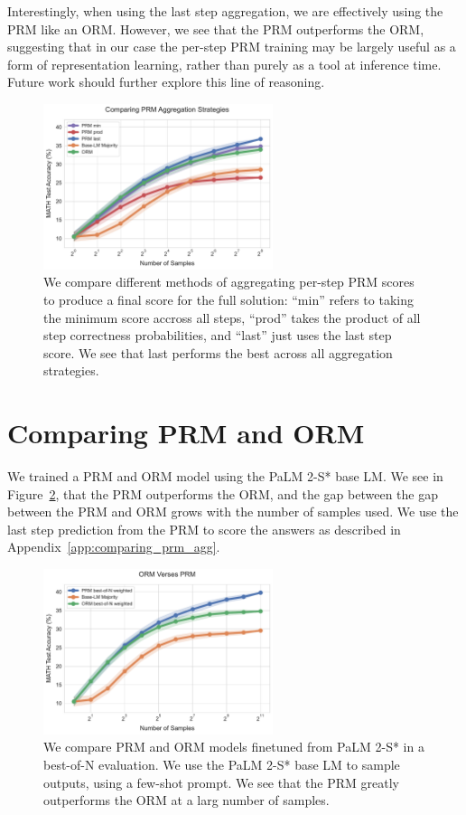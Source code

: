 \documentclass[11pt, letterpaper, logo]{googledeepmind}
\begin{document}
Interestingly, when using the last step aggregation, we are effectively using the PRM like an ORM. However, we see that the PRM outperforms the ORM, suggesting that in our case the per-step PRM training may be largely useful as a form of representation learning, rather than purely as a tool at inference time. Future work should further explore this line of reasoning.

\begin{figure}
    \centering
    \includegraphics[width=0.6\textwidth]{figures/prm_agg_comparing_output.pdf}
    \caption{We compare different methods of aggregating per-step PRM scores to produce a final score for the full solution: ``min'' refers to taking the minimum score accross all steps, ``prod'' takes the product of all step correctness probabilities, and ``last'' just uses the last step score. We see that last performs the best across all aggregation strategies.}
    \label{fig:comparing_prm_aggregations}
\end{figure}

\section{Comparing PRM and ORM}
\label{app:comparing_prm_orm}

We trained a PRM and ORM model using the PaLM 2-S* base LM. We see in Figure~\ref{fig:prm_v_orm}, that the PRM outperforms the ORM, and the gap between the gap between the PRM and ORM grows with the number of samples used. We use the last step prediction from the PRM to score the answers as described in Appendix~\ref{app:comparing_prm_agg}.

\begin{figure}
    \centering
    \includegraphics[width=0.6\textwidth]{figures/prm_comparing_output3.pdf}
    \caption{We compare PRM and ORM models finetuned from PaLM 2-S* in a best-of-N evaluation. We use the PaLM 2-S* base LM to sample outputs, using a few-shot prompt. We see that the PRM greatly outperforms the ORM at a larg number of samples.}
    \label{fig:prm_v_orm}
\end{figure}
\end{document}
